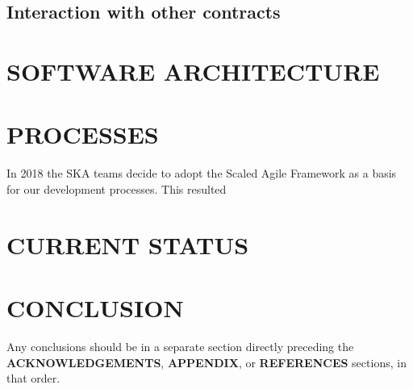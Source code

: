 \documentclass[a4paper,
               biblatex,     %
               keeplastbox,   %
               ]{jacow}
\begin{document}
\subsection{Interaction with other contracts}

\section{SOFTWARE ARCHITECTURE}


\section{PROCESSES}
In 2018 the SKA teams decide to adopt the Scaled Agile Framework as a basis for our development processes. This resulted 


\section{CURRENT STATUS}


\section{CONCLUSION}

Any conclusions should be in a separate section directly preceding
the \textbf{ACKNOWLEDGEMENTS}, \textbf{APPENDIX}, or \textbf{REFERENCES} sections, in that
order.
\end{document}
